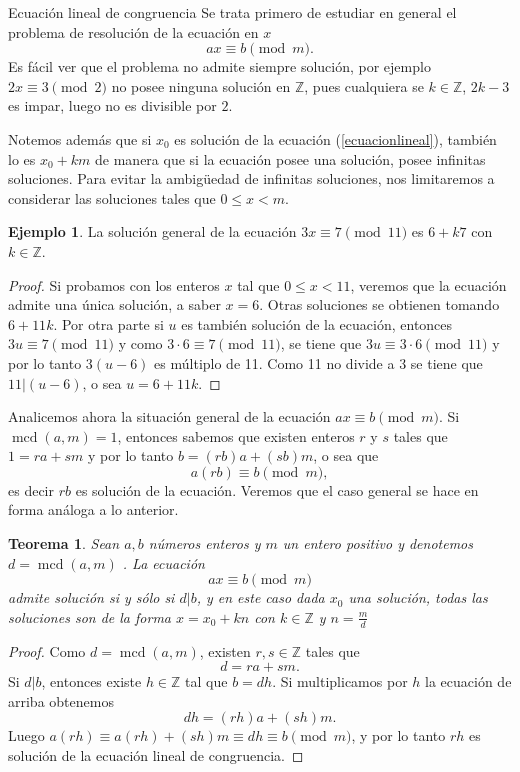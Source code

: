 \documentclass[11pt,spanish,makeidx]{amsbook}
\newtheorem{teorema}{Teorema}[section]
\theoremstyle{definition}
\newtheorem{ejemplo}{Ejemplo}[section]
\theoremstyle{remark}
\newcommand \mcd{\operatorname{mcd}}
\begin{document}
\begin{section}{Ecuación lineal de congruencia}
Se trata primero de estudiar en general el problema de resolución de la ecuación en $x$
\begin{equation}\label{ecuacionlineal}
 ax \equiv b \pmod{m}.
\end{equation}
Es fácil ver que el problema no admite siempre solución, por ejemplo $2x\equiv 3 \pmod{2}$ no posee ninguna solución en $\mathbb Z$, pues cualquiera se $k \in \mathbb Z$, $2k-3$ es impar, luego no es divisible por $2$.

Notemos además que si $x_0$ es solución de la ecuación (\ref{ecuacionlineal}), también lo es $x_0+km$ de manera que si la ecuación posee una solución, posee infinitas soluciones. Para evitar la ambigüedad de infinitas soluciones, nos limitaremos a considerar las soluciones tales que $0\le x < m$.

\begin{ejemplo} La solución general de la ecuación $3x\equiv 7
\pmod{11}$ es $6+k7$ con $k \in \mathbb Z$.
\end{ejemplo}
\begin{proof} Si probamos con los enteros $x$ tal que  $0\le x < 11$, veremos que la ecuación admite una única solución, a saber $x=6$. Otras soluciones se obtienen tomando $6+11k$. Por otra parte si $u$ es también solución de la ecuación, entonces $3u\equiv 7 \pmod{11}$ y  como   $3 \cdot 6 \equiv 7 \pmod{11}$, se tiene que $3u \equiv 3\cdot 6 \pmod{11}$ y por lo tanto $3(u-6)$ es múltiplo de 11. Como 11 no divide a 3 se tiene que $11|(u-6)$, o sea $u=6+11k$.
\end{proof}

Analicemos ahora la situación general de la ecuación $ ax\equiv b \pmod{m}$. Si $\mcd(a,m)=1$, entonces sabemos que existen enteros $r$ y $s$ tales que $1=ra+sm$ y por lo tanto $b=(rb)a +(sb)m$, o sea que
$$
a(rb) \equiv b \pmod{m},
$$
es decir $rb$ es solución de la ecuación. Veremos que el caso general se hace en forma análoga a lo anterior.

\begin{teorema}\label{th-elc} Sean $a,b$ números enteros y $m$ un entero positivo y denotemos $d = \mcd(a,m)$ . La  ecuación 
\begin{equation}\label{eq-elc}
ax \equiv b \pmod{m}
\end{equation}
admite solución si y sólo si $d|b$, y en este caso dada $x_0$ una solución, todas las soluciones son de la forma $x = x_0 + k n$ con $k \in \mathbb Z$ y $n = \displaystyle{\frac{m}{d}}$ 
\end{teorema}
\begin{proof} Como $d =\mcd(a,m)$, existen $r,s \in \mathbb Z$ tales que
$$
d = ra+sm.
$$
Si $d|b$, entonces existe $h\in \mathbb Z$ tal que $b = dh$. Si multiplicamos por $h$ la ecuación de arriba obtenemos
$$
dh = (rh)a+(sh)m.
$$
Luego $a(rh) \equiv a(rh)+(sh)m \equiv dh \equiv b \pmod{m}$, y por lo tanto $rh$ es solución de la ecuación lineal de congruencia.    


\end{proof}
\end{section}
\end{document}
